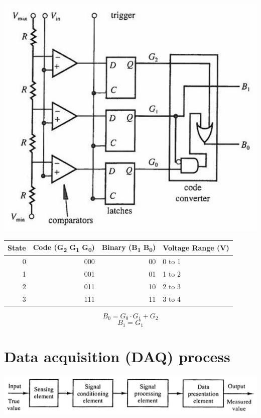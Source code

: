 \documentclass[11pt]{article}
\begin{document}
\begin{center}
\includegraphics[width=.9\linewidth]{./images/flash-converter.png}
\end{center}

\begin{center}
\begin{tabular}{r|r|r|l}
State & Code (G\textsubscript{2} G\textsubscript{1} G\textsubscript{0}) & Binary (B\textsubscript{1} B\textsubscript{0}) & Voltage Range (V)\\
\hline
0 & 000 & 00 & 0 to 1\\
1 & 001 & 01 & 1 to 2\\
2 & 011 & 10 & 2 to 3\\
3 & 111 & 11 & 3 to 4\\
\end{tabular}
\end{center}

\[B_0 = G_0 \cdot G_1 + G_2\]
\[B_1 = G_1\]
\section{Data acquisition (DAQ) process}
\label{sec:org1e1e1a2}
\begin{center}
\includegraphics[width=.9\linewidth]{./images/data-acquisition-process.png}
\end{center}
\end{document}
